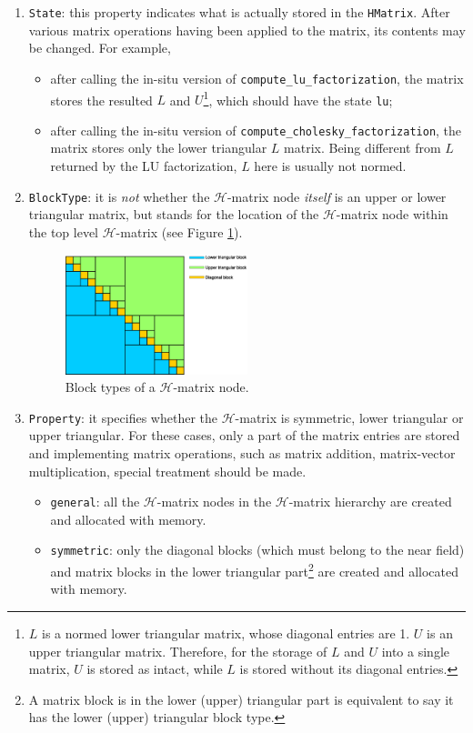 \documentclass[11pt, a4paper]{article}
\begin{document}
\begin{enumerate}
\item \texttt{State}: this property indicates what is actually stored in the
  \texttt{HMatrix}. After various matrix operations having been applied to the matrix, its
  contents may be changed. For example,
  \begin{itemize}
  \item after calling the in-situ version of \texttt{compute\_lu\_factorization}, the
    matrix stores the resulted $L$ and $U$\footnote{$L$ is a normed lower triangular
      matrix, whose diagonal entries are 1. $U$ is an upper triangular matrix. Therefore,
      for the storage of $L$ and $U$ into a single matrix, $U$ is stored as intact, while
      $L$ is stored without its diagonal entries.}, which should have the state
    \texttt{lu};
  \item after calling the in-situ version of \texttt{compute\_cholesky\_factorization},
    the matrix stores only the lower triangular $L$ matrix. Being different from $L$
    returned by the LU factorization, $L$ here is usually not normed.
  \end{itemize}
\item \texttt{BlockType}: it is \emph{not} whether the $\mathcal{H}$-matrix node \emph{itself} is
  an upper or lower triangular matrix, but stands for the location of the
  $\mathcal{H}$-matrix node within the top level $\mathcal{H}$-matrix (see Figure
  \ref{fig:hmat-node-block-types}).
  \begin{figure}[htbp]
    \centering
    \includegraphics[width=0.5\textwidth, height=\textheight, keepaspectratio]{figures/2023-01-23-hmat-block-type.eps}
    \caption{Block types of a $\mathcal{H}$-matrix node.}
    \label{fig:hmat-node-block-types}
  \end{figure}
\item \texttt{Property}: it specifies whether the $\mathcal{H}$-matrix is symmetric, lower
  triangular or upper triangular. For these cases, only a part of the matrix entries are
  stored and implementing matrix operations, such as matrix addition, matrix-vector
  multiplication, special treatment should be made.
  \begin{itemize}
  \item \texttt{general}: all the $\mathcal{H}$-matrix nodes in the $\mathcal{H}$-matrix
    hierarchy are created and allocated with memory.
  \item \texttt{symmetric}: only the diagonal blocks (which must belong to the near field)
    and matrix blocks in the lower triangular part\footnote{A matrix block is in the lower
      (upper) triangular part is equivalent to say it has the lower (upper) triangular
      block type.} are created and allocated with memory.


\end{itemize}
\end{enumerate}
\end{document}
